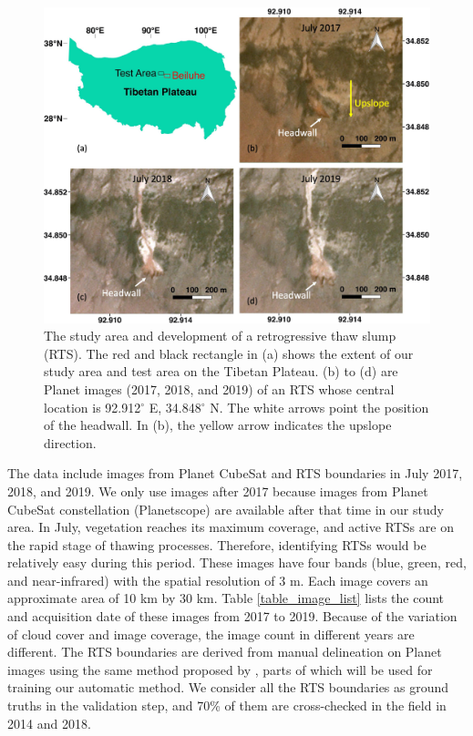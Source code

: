 \documentclass[authoryear,preprint,review,12pt]{elsarticle}
\begin{document}
\begin{figure} 
	\centering
	\includegraphics[width=14cm]{figs/rts_multi_images_study_area_v2_trim.jpg}
	\caption{The study area and development of a retrogressive thaw slump (RTS). The red and black rectangle in (a) shows the extent of our study area and test area on the Tibetan Plateau. (b) to (d) are Planet images (2017, 2018, and 2019) of an RTS whose central location is 92.912$^\circ$ E, 34.848$^\circ$ N. The white arrows point the position of the headwall. In (b), the yellow arrow indicates the upslope direction.}
	\label{fig_multi_rts_image_studyarea}
\end{figure}


The data include images from Planet CubeSat and RTS boundaries in July 2017, 2018, and 2019.
We only use images after 2017 because images from Planet CubeSat constellation (Planetscope) are available after that time in our study area.  
In July, vegetation reaches its maximum coverage, and active RTSs are on the rapid stage of thawing processes. 
Therefore, identifying RTSs would be relatively easy during this period.
These images have four bands (blue, green, red, and near-infrared) with the spatial resolution of 3 m. 
Each image covers an approximate area of 10 km by 30 km.
Table \ref{table_image_list} lists the count and acquisition date of these images from 2017 to 2019. 
Because of the variation of cloud cover and image coverage, the image count in different years are different.
The RTS boundaries are derived from manual delineation on Planet images using the same method proposed by \cite{huang2020using}, parts of which will be used for training our automatic method. 
We consider all the RTS boundaries as ground truths in the validation step, and 70\% of them are cross-checked in the field in 2014 and 2018. %
\end{document}
